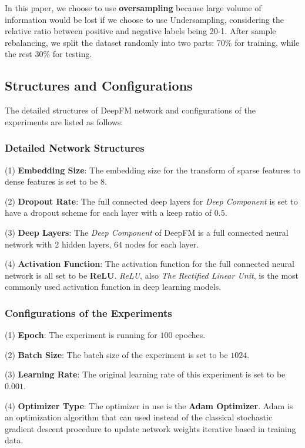 \documentclass{article}
\begin{document}
    In this paper, we choose to use \textbf{oversampling} because large volume of information would be lost if we choose to use Undersampling, considering the relative ratio between positive and negative labels being 20-1. After sample rebalancing, we split the dataset randomly into two parts: 70\% for training, while the rest 30\% for testing.
    
    \subsection{Structures and Configurations}
    The detailed structures of DeepFM network and configurations of the experiments are listed as follows:
    \subsubsection{Detailed Network Structures}
    (1) \textbf{Embedding Size}:
    The embedding size for the transform of sparse features to dense features is set to be $8$.
    
    (2) \textbf{Dropout Rate}:
    The full connected deep layers for \emph{Deep Component} is set to have a dropout scheme for each layer with a keep ratio of $0.5$.
    
    (3) \textbf{Deep Layers}:
    The \emph{Deep Component} of DeepFM is a full connected neural network with $2$ hidden layers, $64$ nodes for each layer.
    
    (4) \textbf{Activation Function}:
    The activation function for the full connected neural network is all set to be \textbf{ReLU}. \emph{ReLU}, also \emph{The Rectified Linear Unit}, is the most commonly used activation function in deep learning models.
    
    \subsubsection{Configurations of the Experiments}
    (1) \textbf{Epoch}:
    The experiment is running for $100$ epoches.
    
    (2) \textbf{Batch Size}:
    The batch size of the experiment is set to be $1024$.
    
    (3) \textbf{Learning Rate}:
    The original learning rate of this experiment is set to be $0.001$.
    
    (4) \textbf{Optimizer Type}: 
    The optimizer in use is the \textbf{Adam Optimizer}. Adam is an optimization algorithm that can used instead of the classical stochastic gradient descent procedure to update network weights iterative based in training data.
    
\end{document}
